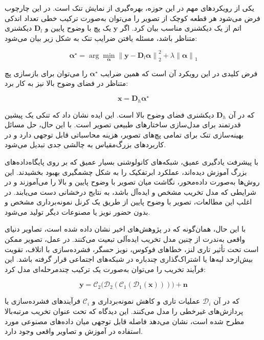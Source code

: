 یکی از رویکردهای مهم در این حوزه، بهره‌گیری از نمایش تنک است. در این چارچوب فرض می‌شود هر قطعه کوچک از تصویر را می‌توان به‌صورت ترکیب خطی تعداد اندکی اتم از یک دیکشنری مناسب بیان کرد. اگر $\mathbf{y}$ یک پچ با وضوح پایین و $\mathbf{D}_l$ دیکشنری متناظر باشد، مسئله یافتن ضرایب تنک به شکل زیر بیان می‌شود:

\begin{equation}
	\boldsymbol{\alpha}^\star =
	\arg\min_{\boldsymbol{\alpha}}
	\left\|
	\mathbf{y} - \mathbf{D}_l \boldsymbol{\alpha}
	\right\|_2^2
	+
	\lambda
	\left\|
	\boldsymbol{\alpha}
	\right\|_1
\end{equation}

فرض کلیدی در این رویکرد آن است که همین ضرایب $\boldsymbol{\alpha}^\star$ را می‌توان برای بازسازی پچ متناظر در فضای وضوح بالا نیز به کار برد:

\begin{equation}
	\mathbf{x} = \mathbf{D}_h \boldsymbol{\alpha}^\star
\end{equation}

که در آن $\mathbf{D}_h$ دیکشنری فضای وضوح بالا است. این ایده نشان داد که تنکی یک پیشین قدرتمند برای مدل‌سازی ساختارهای طبیعی تصویر است. با این حال، حل مسائل بهینه‌سازی تنک برای تمامی پچ‌های تصویر، هزینه محاسباتی قابل توجهی دارد و در کاربردهای بزرگ‌مقیاس به چالشی جدی تبدیل می‌شود.

با پیشرفت یادگیری عمیق، شبکه‌های کانولوشنی بسیار عمیق که بر روی پایگاه‌داده‌های بزرگ آموزش دیده‌اند، عملکرد ابرتفکیک را به شکل چشمگیری بهبود بخشیدند. این روش‌ها به‌صورت داده‌محور، نگاشت میان تصویر با وضوح پایین و بالا را می‌آموزند و در شرایطی که مدل تخریب مشخص و ایده‌آل باشد، به نتایج درخشانی دست می‌یابند. در اغلب این مطالعات، تصویر با وضوح پایین از طریق یک کرنل نمونه‌برداری مشخص و بدون حضور نویز یا مصنوعات دیگر تولید می‌شود.

با این حال، همان‌گونه که در پژوهش‌های اخیر نشان داده شده است، تصاویر دنیای واقعی به‌ندرت از چنین مدل تخریب ایده‌آلی تبعیت می‌کنند. در عمل، تصویر ممکن است تحت تأثیر تاری لنز، خطاهای فوکوس، نویز حسگر، فشرده‌سازی با اتلاف، تقویت بیش‌ازحد لبه‌ها یا اشتراک‌گذاری چندباره در شبکه‌های اجتماعی قرار گرفته باشد. این فرآیند تخریب را می‌توان به‌صورت یک ترکیب چندمرحله‌ای مدل کرد:

\begin{equation}
	\mathbf{y} =
	\mathcal{C}_2
	\Big(
	\mathcal{D}_2
	(
	\mathcal{C}_1
	(
	\mathcal{D}_1(\mathbf{x})
	)
	)
	\Big)
	+
	\mathbf{n}
\end{equation}

که در آن $\mathcal{D}_i$ عملیات تاری و کاهش نمونه‌برداری و $\mathcal{C}_i$ فرآیندهای فشرده‌سازی یا پردازش‌های غیرخطی را مدل می‌کنند. این دیدگاه که تحت عنوان تخریب مرتبه‌بالا مطرح شده است، نشان می‌دهد فاصله قابل توجهی میان داده‌های مصنوعی مورد استفاده در آموزش و تصاویر واقعی وجود دارد.

